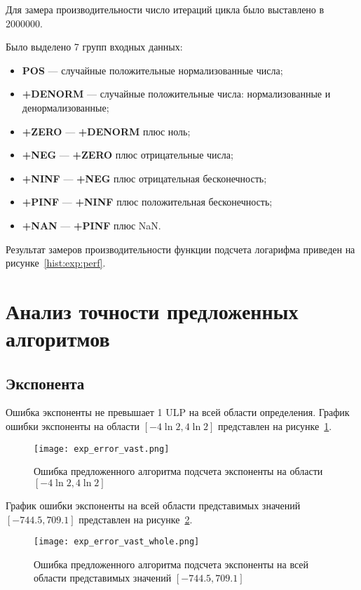 Для замера производительности число итераций цикла было выставлено в 2000000.

Было выделено 7 групп входных данных:

\begin{itemize}
    \item \textbf{POS} --- случайные положительные нормализованные числа;
    \item \textbf{+DENORM} --- случайные положительные числа: нормализованные и денормализованные;
    \item \textbf{+ZERO} --- \textbf{+DENORM} плюс ноль;
    \item \textbf{+NEG} --- \textbf{+ZERO} плюс отрицательные числа;
    \item \textbf{+NINF} --- \textbf{+NEG} плюс отрицательная бесконечность;
    \item \textbf{+PINF} --- \textbf{+NINF} плюс положительная бесконечность;
    \item \textbf{+NAN} --- \textbf{+PINF} плюс NaN.
\end{itemize}

Результат замеров производительности функции подсчета логарифма приведен на рисунке~\ref{hist:exp:perf}.

\section{Анализ точности предложенных алгоритмов}

\subsection{Экспонента}

Ошибка экспоненты не превышает 1 ULP на всей области определения.
График ошибки экспоненты на области $[-4\ln{2}, 4\ln{2}]$ представлен на рисунке~\ref{plot:exp:small}.

\begin{figure}[hbt]
    \centering
    \texttt{[image: exp\_error\_vast.png]}
    \caption{Ошибка предложенного алгоритма подсчета экспоненты на области $[-4\ln{2}, 4\ln{2}]$}
    \label{plot:exp:small}
\end{figure}

График ошибки экспоненты на всей области представимых значений \newline $[-744.5, 709.1]$ представлен на рисунке~\ref{plot:exp:whole}.

\begin{figure}[hbt]
    \centering
    \texttt{[image: exp\_error\_vast\_whole.png]}
    \caption{Ошибка предложенного алгоритма подсчета экспоненты на всей области представимых значений $[-744.5, 709.1]$}
    \label{plot:exp:whole}
\end{figure}

